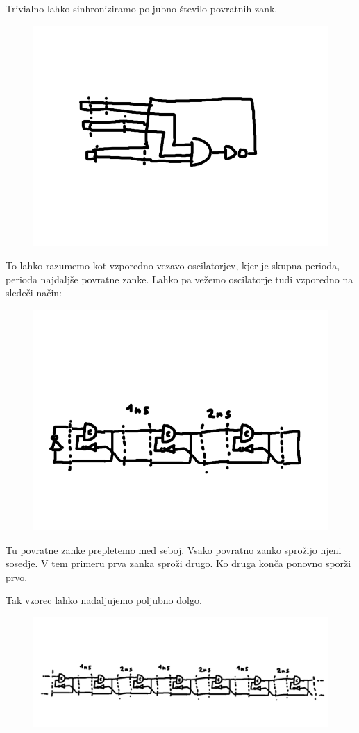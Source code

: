 Trivialno lahko sinhroniziramo poljubno število povratnih zank.

\begin{figure}
	\centering
	\includegraphics[width=0.7\linewidth]{slike/dly3}
	\caption{}
	\label{fig:celement}
\end{figure}

To lahko razumemo kot vzporedno vezavo oscilatorjev, kjer je skupna perioda, perioda najdaljše povratne zanke. 
Lahko pa vežemo oscilatorje tudi vzporedno na sledeči način:


\begin{figure}
	\centering
	\includegraphics[width=0.7\linewidth]{slike/dly4}
	\caption{}
	\label{fig:celement}
\end{figure}

Tu povratne zanke prepletemo med seboj. Vsako povratno zanko sprožijo njeni sosedje. V tem primeru prva zanka sproži drugo. Ko druga konča ponovno sporži prvo.

Tak vzorec lahko nadaljujemo poljubno dolgo.
\begin{figure}
	\centering
	\includegraphics[width=0.7\linewidth]{slike/dly5}
	\caption{}
	\label{fig:celement}
\end{figure}


